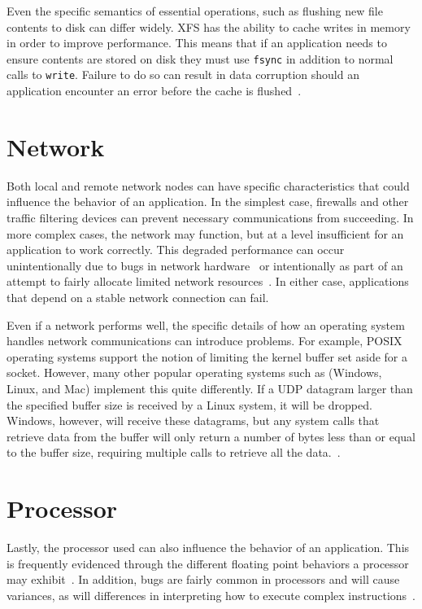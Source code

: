 Even the specific semantics of essential operations, such as flushing new file contents to disk can differ widely.
XFS has the ability to cache writes in memory in order to improve performance.
This means that if an application needs to ensure contents are stored on disk they must use {\tt fsync} in addition to normal calls to {\tt write}.
Failure to do so can result in data corruption should an application encounter an error before the cache is flushed~\cite{xfscorruption}.


\section{Network}
Both local and remote network nodes
can have specific characteristics that could influence the behavior of an
application.
In the simplest case,
firewalls and other traffic filtering devices can prevent necessary communications from succeeding.
In more complex cases, the network may function, but at a level insufficient for an application to work correctly.
This degraded performance can occur unintentionally due to bugs in network hardware~\cite{pfsensebug} or intentionally as part of an attempt to fairly allocate limited network resources~\cite{dlinkarticle}.
In either case, applications that depend on a stable network connection can fail.

Even if a network performs well,
the specific details of how an operating system handles network communications can introduce problems.
For example, POSIX operating
systems support the notion of limiting the kernel buffer set aside for a
socket.  However, many other popular operating
systems such as (Windows, Linux, and Mac)
implement this quite differently.
If a UDP datagram
larger than the specified buffer size is received by a Linux system,
it will be dropped.
Windows,
however,
will receive these datagrams,
but
any system calls that retrieve data from the buffer
will only return a number of bytes less than or equal to the
buffer size, requiring multiple calls
to retrieve all the data.~\cite{Zhuang_NSDI_2014}.

\section{Processor}
Lastly, the processor used can also influence the
behavior of an application.  This is frequently
evidenced through the different floating point behaviors a
processor may exhibit~\cite{ArbitraryPrecision}.
In addition, bugs are fairly common
in processors and will cause variances, as will
differences in interpreting
how to execute complex instructions~\cite{Microarch}.

